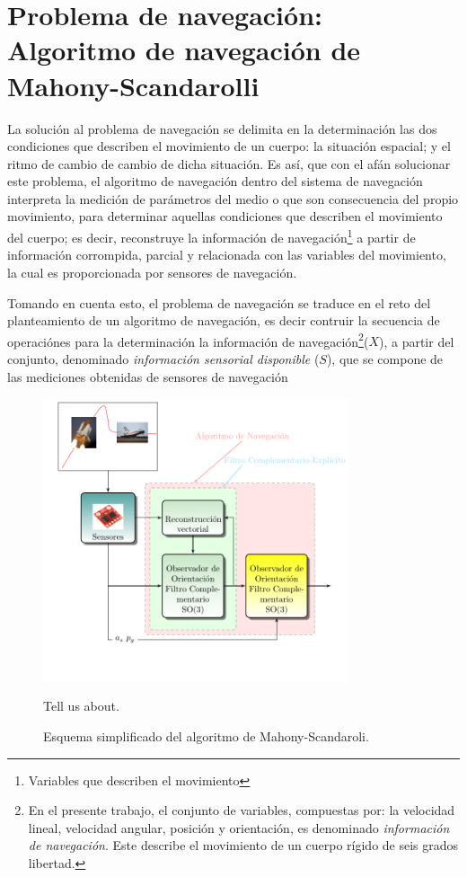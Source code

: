 \documentclass[conference]{IEEEtran}
\begin{document}
\section{Problema de navegación: Algoritmo de navegación de Mahony-Scandarolli}
La solución al problema de navegación se delimita en la determinación  las dos condiciones que describen el movimiento de un cuerpo: la situación espacial; y el ritmo de cambio de cambio de dicha situación. Es así, que con el afán solucionar este problema, el algoritmo de navegación dentro del sistema de navegación interpreta la medición de parámetros del medio o que son consecuencia del propio movimiento, para determinar aquellas condiciones que describen el movimiento del cuerpo; es decir, reconstruye la información de navegación\footnote{Variables que describen el movimiento} a partir de información corrompida, parcial y relacionada con las variables del movimiento, la cual es proporcionada por sensores de navegación.\par
Tomando en cuenta esto, el problema de navegación se traduce en el reto del planteamiento de un algoritmo de navegación, es decir contruir la secuencia de operaciónes para la determinación la información de navegación\footnote{En el presente trabajo, el conjunto de variables, compuestas por: la velocidad lineal, velocidad angular, posición y orientación, es denominado \emph{información de navegación}. Este describe el movimiento de un cuerpo rígido de seis grados libertad.}($X$), a partir del conjunto, denominado \emph{información sensorial disponible} ($S$), que se compone de las mediciones obtenidas de sensores de navegación\par
\begin{figure}
\begin{center}
\includegraphics[width=9cm,clip]{intro_fig4.pdf}
\caption{Esquema simplificado del algoritmo de Mahony-Scandaroli.}
\scriptsize{Tell us about.}
\label{solucionMS_fig1}
\end{center}
\end{figure}
\end{document}
